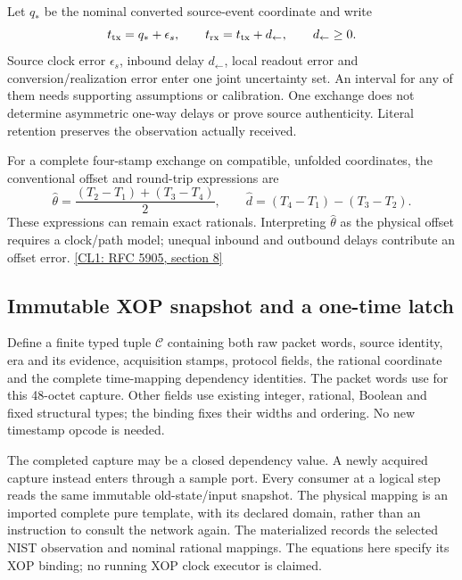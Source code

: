 Let $q_*$ be the nominal converted source-event coordinate and write
\begin{equation}
 t_{\rm tx}=q_*+\epsilon_s,\qquad
 t_{\rm rx}=t_{\rm tx}+d_{\leftarrow},\qquad d_{\leftarrow}\geq0 .
 \label{eq:r14-clock-event-error}
\end{equation}
Source clock error $\epsilon_s$, inbound delay $d_{\leftarrow}$, local readout
error and conversion/realization error enter one joint uncertainty set.
An interval for any of them needs supporting assumptions or calibration.
One exchange does not determine asymmetric one-way delays or prove source
authenticity. Literal retention preserves the observation actually received.

For a complete four-stamp exchange on compatible, unfolded coordinates,
the conventional offset and round-trip expressions are
\begin{equation}
 \widehat\theta=\frac{(T_2-T_1)+(T_3-T_4)}2,\qquad
 \widehat d=(T_4-T_1)-(T_3-T_2).
 \label{eq:r14-ntp-offset}
\end{equation}
These expressions can remain exact rationals. Interpreting
$\widehat\theta$ as the physical offset requires a clock/path model;
unequal inbound and outbound delays contribute an offset error.
\href{https://www.rfc-editor.org/rfc/rfc5905.html#section-8}{[CL1: RFC 5905, section 8]}

\subsection{Immutable XOP snapshot and a one-time latch}
Define a finite typed tuple $\mathcal C$ containing both raw packet words,
source identity, era and its evidence, acquisition stamps, protocol fields,
the rational coordinate and the complete time-mapping dependency identities.
The packet words use  for this 48-octet capture. Other fields
use existing integer, rational, Boolean and fixed structural types; the
binding fixes their widths and ordering. No new timestamp opcode is needed.

The completed capture may be a closed dependency value. A newly acquired
capture instead enters through a sample port. Every consumer at a logical
step reads the same immutable old-state/input snapshot. The physical mapping
is an imported complete pure template, with its declared domain, rather than
an instruction to consult the network again.
The materialized  records the
selected NIST observation and nominal rational mappings. The equations here
specify its XOP binding; no running XOP clock executor is claimed.

